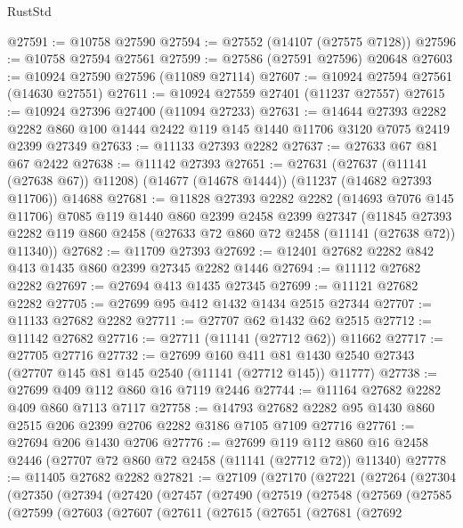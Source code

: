 \begin{lexlean}{RustStd}
\begin{coremodule}
@27591 := @10758 @27590
@27594 := @27552 (@14107 (@27575 @7128))
@27596 := @10758 @27594 @27561
@27599 := @27586 (@27591 @27596) @20648
@27603 := @10924 @27590 @27596 (@11089 @27114)
@27607 := @10924 @27594 @27561 (@14630 @27551)
@27611 := @10924 @27559 @27401 (@11237 @27557)
@27615 := @10924 @27396 @27400 (@11094 @27233)
@27631 := @14644
    @27393
    @2282
    @2282
    @860
    @100
    @1444
    @2422
    @119
    @145
    @1440
    @11706
    @3120
    @7075
    @2419
    @2399
    @27349
@27633 := @11133 @27393 @2282
@27637 := @27633 @67 @81 @67 @2422
@27638 := @11142 @27393
@27651 := @27631
    (@27637 (@11141 (@27638 @67)) @11208)
    (@14677 (@14678 @1444))
    (@11237 (@14682 @27393 @11706))
    @14688
@27681 := @11828
    @27393
    @2282
    @2282
    (@14693 @7076 @145 @11706)
    @7085
    @119
    @1440
    @860
    @2399
    @2458
    @2399
    @27347
    (@11845 @27393 @2282 @119 @860 @2458 (@27633 @72 @860 @72 @2458 (@11141 (@27638 @72)) @11340))
@27682 := @11709 @27393
@27692 := @12401 @27682 @2282 @842 @413 @1435 @860 @2399 @27345 @2282 @1446
@27694 := @11112 @27682 @2282
@27697 := @27694 @413 @1435 @27345
@27699 := @11121 @27682 @2282
@27705 := @27699 @95 @412 @1432 @1434 @2515 @27344
@27707 := @11133 @27682 @2282
@27711 := @27707 @62 @1432 @62 @2515
@27712 := @11142 @27682
@27716 := @27711 (@11141 (@27712 @62)) @11662
@27717 := @27705 @27716
@27732 := @27699
    @160
    @411
    @81
    @1430
    @2540
    @27343
    (@27707 @145 @81 @145 @2540 (@11141 (@27712 @145)) @11777)
@27738 := @27699 @409 @112 @860 @16 @7119 @2446
@27744 := @11164 @27682 @2282 @409 @860 @7113 @7117
@27758 := @14793 @27682 @2282 @95 @1430 @860 @2515 @206 @2399 @2706 @2282 @3186 @7105 @7109 @27716
@27761 := @27694 @206 @1430 @2706
@27776 := @27699
    @119
    @112
    @860
    @16
    @2458
    @2446
    (@27707 @72 @860 @72 @2458 (@11141 (@27712 @72)) @11340)
@27778 := @11405 @27682 @2282
@27821 := @27109
    (@27170
      (@27221
        (@27264
          (@27304
            (@27350
              (@27394
                (@27420
                  (@27457
                    (@27490
                      (@27519
                        (@27548
                          (@27569
                            (@27585
                              (@27599
                                (@27603
                                  (@27607
                                    (@27611
                                      (@27615
                                        (@27651
                                          (@27681
                                            (@27692

\end{coremodule}
\end{lexlean}

